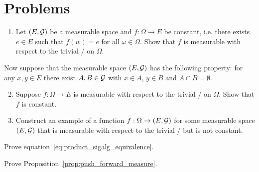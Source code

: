 
\section{Problems}

\begin{problem}
\hfil
\begin{enumerate}
\item Let $(E, \mathcal G)$ be a measurable space and $f : \Omega \to E$ be constant, i.e. there exists $e \in E$ such that $f(w) = e$ for all $\omega \in \Omega$. Show that $f$ is measurable with respect to the trivial \sigalg/ on $\Omega$.  
\end{enumerate}

Now suppose that the measurable space $(E, \mathcal G)$ has the following property: for any $x,y\in E$ there exist $A, B \in \mathcal G$ with $x \in A$, $y \in B$ and $A \cap B = \emptyset$.

\begin{enumerate}
\setcounter{enumi}{1}
\item Suppose $f : \Omega \to E$ is measurable with respect to the trivial \sigalg/ on $\Omega$. Show that $f$ is constant.
\item Construct an example of a function $f : \Omega \to (E,\mathcal G)$ for some measurable space $(E, \mathcal G)$ that is measurable with respect to the trivial \sigalg/ but is not constant.
\end{enumerate}
\end{problem}

\begin{problem}\label{prb:product_sigalg_equivalence}
Prove equation~\eqref{eq:product_sigalg_equivalence}.
\end{problem}


\begin{problem}\label{prb:push_forward_measure}
Prove Proposition~\ref{prop:push_forward_measure}.
\end{problem}

